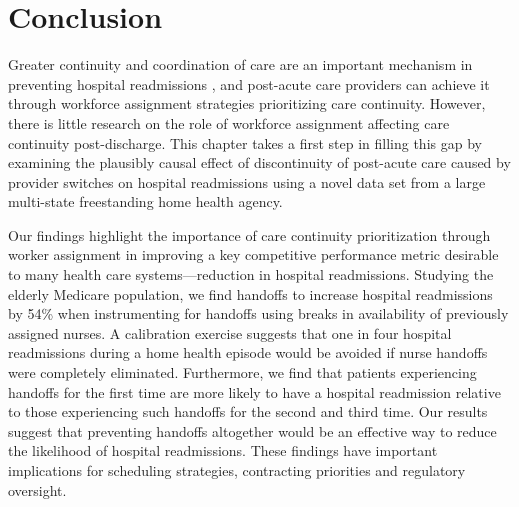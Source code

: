 \documentclass[final,12pt, notitlepage]{article}
\begin{document}


\section{Conclusion} \label{sec:conclusion}

Greater continuity and coordination of care are an important mechanism in preventing hospital readmissions \citep{Naylor1999}, and post-acute care providers can achieve it through workforce assignment strategies prioritizing care continuity. However, there is little research on the role of workforce assignment affecting care continuity post-discharge. This chapter takes a first step in filling this gap by examining the plausibly causal effect of discontinuity of post-acute care caused by provider switches on hospital readmissions using a novel data set from a large multi-state freestanding home health agency.

Our findings highlight the importance of care continuity prioritization through worker assignment in improving a key competitive performance metric desirable to many health care systems---reduction in hospital readmissions. Studying the elderly Medicare population, we find handoffs to increase hospital readmissions by 54\% when instrumenting for handoffs using breaks in availability of previously assigned nurses. A calibration exercise suggests that one in four hospital readmissions during a home health episode would be avoided if nurse handoffs were completely eliminated.
Furthermore, we find that patients experiencing handoffs for the first time are more likely to have a hospital readmission relative to those experiencing such handoffs for the second and third time. Our results suggest that preventing handoffs altogether would be an effective way to reduce the likelihood of hospital readmissions. These findings have important implications for scheduling strategies, contracting priorities and regulatory oversight. 
\end{document}
